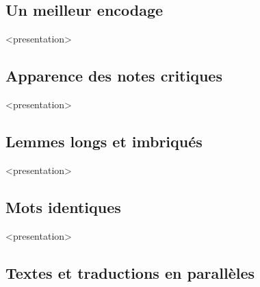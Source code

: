 \documentclass[transnotheorems,noamsthm]{beamer}
\newenvironment{slide}{%
  \begin{frame}
  <presentation>\mode<presentation>{\frametitle{\insertsubsection}}%
  }%
  {\end{frame}}
\newcounter{code}
\begin{document}
\subsection{Un meilleur encodage}

\begin{slide}
  \begin{minipage}{0.8\textwidth}
    
  \end{minipage}
\end{slide}

\subsection{Apparence des notes critiques}


\begin{slide}
  \begin{minipage}{0.8\textwidth}
    
  \end{minipage}
\end{slide}
\subsection{Lemmes longs et imbriqués}

\begin{slide}
  \begin{minipage}{0.8\textwidth}
    
  \end{minipage}
\end{slide}
\subsection{Mots identiques}

\newcommand{\variant}[3]{\edtext{#1}{\Afootnote{#2: #3}}}
\newcommand{\om}[2]{\variant{#1}{#2}{\emph{om.}}}
\newcommand{\add}[3]{\variant{#1}{#2}{\emph{add.} #3}}
\begin{slide}
  \begin{minipage}{0.8\textwidth}
    
  \end{minipage}
\end{slide}
\subsection{Textes et traductions en parallèles}
\end{document}
